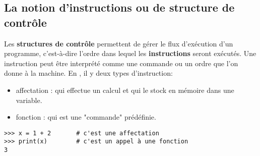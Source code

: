 \subsection{La notion d'instructions ou de structure de contrôle}
Les \textbf{structures de contrôle} permettent de gérer le flux d'exécution d'un programme, c'est-à-dire l'ordre dans lequel les \textbf{instructions} seront exécutés. Une instruction peut être interprété comme une commande ou un ordre que l'on donne à la machine. En \py, il y deux types d’instruction:
\begin{itemize}
	\item affectation : qui effectue un calcul et qui le stock en mémoire dans une variable.
	\item fonction    : qui est une "commande" prédéfinie. 
\end{itemize}
\begin{myexample}
	\vspace{-3mm}
	\begin{lstlisting}[numbers=none]
>>> x = 1 + 2       # c'est une affectation
>>> print(x)        # c'est un appel à une fonction
3
	\end{lstlisting}
	\vspace{-3mm}
\end{myexample}




